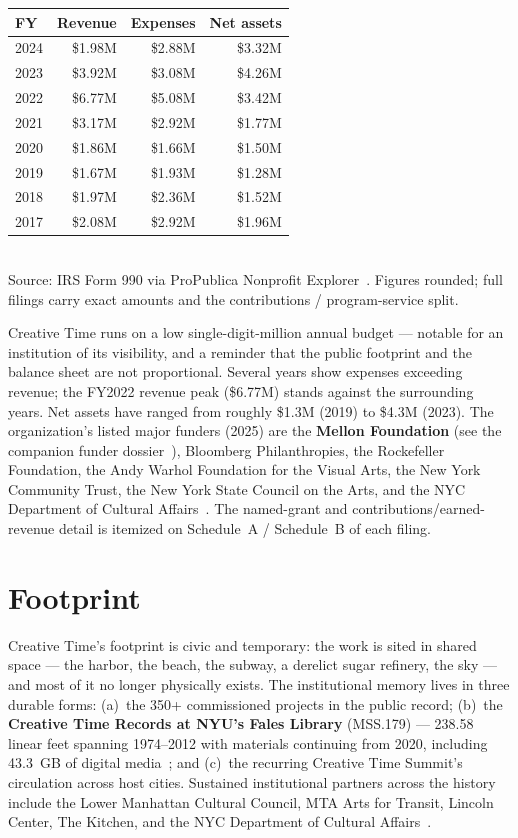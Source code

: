 \documentclass[10pt,letterpaper,twocolumn]{article}
\begin{document}
\begin{table}[h]
\footnotesize
\centering
\setlength{\tabcolsep}{3pt}
\begin{tabularx}{\columnwidth}{lrrr}
\toprule
\textbf{FY} & \textbf{Revenue} & \textbf{Expenses} & \textbf{Net assets} \\
\midrule
2024 & \$1.98M & \$2.88M & \$3.32M \\
2023 & \$3.92M & \$3.08M & \$4.26M \\
2022 & \$6.77M & \$5.08M & \$3.42M \\
2021 & \$3.17M & \$2.92M & \$1.77M \\
2020 & \$1.86M & \$1.66M & \$1.50M \\
2019 & \$1.67M & \$1.93M & \$1.28M \\
2018 & \$1.97M & \$2.36M & \$1.52M \\
2017 & \$2.08M & \$2.92M & \$1.96M \\
\bottomrule
\end{tabularx}
\\[0.3em]
\footnotesize Source: IRS Form 990 via ProPublica Nonprofit Explorer~\citep{ctpropublica}. Figures rounded; full filings carry exact amounts and the contributions / program-service split.
\end{table}

Creative Time runs on a low single-digit-million annual budget --- notable for an institution of its visibility, and a reminder that the public footprint and the balance sheet are not proportional. Several years show expenses exceeding revenue; the FY2022 revenue peak (\$6.77M) stands against the surrounding years. Net assets have ranged from roughly \$1.3M (2019) to \$4.3M (2023). The organization's listed major funders (2025) are the \textbf{Mellon Foundation} (see the companion funder dossier~\citep{ac2026mellon}), Bloomberg Philanthropies, the Rockefeller Foundation, the Andy Warhol Foundation for the Visual Arts, the New York Community Trust, the New York State Council on the Arts, and the NYC Department of Cultural Affairs~\citep{ctabout}. The named-grant and contributions/earned-revenue detail is itemized on Schedule~A / Schedule~B of each filing.

\section{Footprint}

Creative Time's footprint is civic and temporary: the work is sited in shared space --- the harbor, the beach, the subway, a derelict sugar refinery, the sky --- and most of it no longer physically exists. The institutional memory lives in three durable forms: (a)~the 350+ commissioned projects in the public record; (b)~the \textbf{Creative Time Records at NYU's Fales Library} (MSS.179) --- 238.58 linear feet spanning 1974--2012 with materials continuing from 2020, including 43.3~GB of digital media~\citep{ctfales}; and (c)~the recurring Creative Time Summit's circulation across host cities. Sustained institutional partners across the history include the Lower Manhattan Cultural Council, MTA Arts for Transit, Lincoln Center, The Kitchen, and the NYC Department of Cultural Affairs~\citep{ctfales}.
\end{document}
